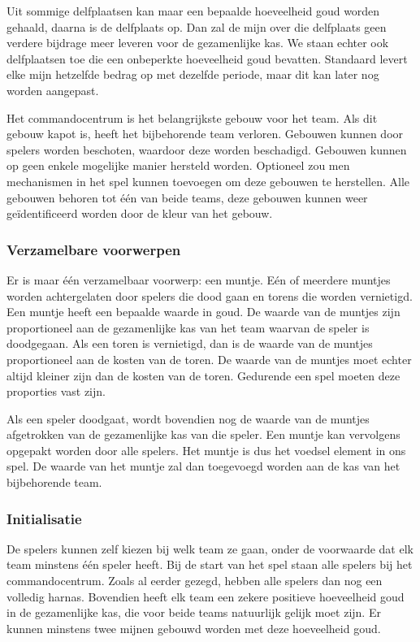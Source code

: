 \documentclass[a4paper,11pt, twoside]{article}
\begin{document}
    Uit sommige delfplaatsen kan maar een bepaalde hoeveelheid goud worden gehaald, daarna is de delfplaats op. Dan zal de mijn over die delfplaats geen verdere bijdrage meer leveren voor de gezamenlijke kas. We staan echter ook delfplaatsen toe die een onbeperkte hoeveelheid goud bevatten. Standaard levert elke mijn hetzelfde bedrag op met dezelfde periode, maar dit kan later nog worden aangepast.

    Het commandocentrum is het belangrijkste gebouw voor het team. Als dit gebouw kapot is, heeft het bijbehorende team verloren. Gebouwen kunnen door spelers worden beschoten, waardoor deze worden beschadigd. Gebouwen kunnen op geen enkele mogelijke manier hersteld worden. Optioneel zou men mechanismen in het spel kunnen toevoegen om deze gebouwen te herstellen. Alle gebouwen behoren tot \'e\'en van beide teams, deze gebouwen kunnen weer ge\"identificeerd worden door de kleur van het gebouw.

    \subsubsection{Verzamelbare voorwerpen}
    Er is maar \'e\'en verzamelbaar voorwerp: een muntje. E\'en of meerdere muntjes worden achtergelaten door spelers die dood gaan en torens die worden vernietigd. Een muntje heeft een bepaalde waarde in goud. De waarde van de muntjes zijn proportioneel aan de gezamenlijke kas van het team waarvan de speler is doodgegaan. Als een toren is vernietigd, dan is de waarde van de muntjes proportioneel aan de kosten van de toren. De waarde van de muntjes moet echter altijd kleiner zijn dan de kosten van de toren. Gedurende een spel moeten deze proporties vast zijn.

    Als een speler doodgaat, wordt bovendien nog de waarde van de muntjes afgetrokken van de gezamenlijke kas van die speler. Een muntje kan vervolgens opgepakt worden door alle spelers. Het muntje is dus het voedsel element in ons spel. De waarde van het muntje zal dan toegevoegd worden aan de kas van het bijbehorende team.

    \subsubsection{Initialisatie}
    De spelers kunnen zelf kiezen bij welk team ze gaan, onder de voorwaarde dat elk team minstens \'e\'en speler heeft. Bij de start van het spel staan alle spelers bij het commandocentrum. Zoals al eerder gezegd, hebben alle spelers dan nog een volledig harnas. Bovendien heeft elk team een zekere positieve hoeveelheid goud in de gezamenlijke kas, die voor beide teams natuurlijk gelijk moet zijn. Er kunnen minstens twee mijnen gebouwd worden met deze hoeveelheid goud.
    \FloatBarrier
\end{document}
